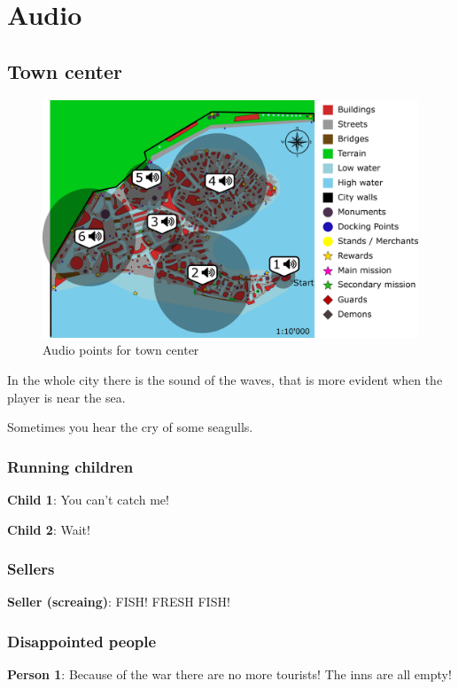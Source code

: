 \section{Audio}

\subsection{Town center}
\begin{figure}[H]
  \centering
  \includegraphics[width=\textwidth]{Images/Maps/dynamiaAudio}
  \caption{Audio points for town center}
\end{figure}

In the whole city there is the sound of the waves, that is more evident when the player is near the sea.

Sometimes you hear the cry of some seagulls.

\subsubsection*{Running children}
\textbf{Child 1}: You can't catch me!

\textbf{Child 2}: Wait!

\subsubsection*{Sellers}
\textbf{Seller (screaing)}: FISH! FRESH FISH!

\subsubsection*{Disappointed people}
\textbf{Person 1}: Because of the war there are no more tourists! The inns are all empty!

